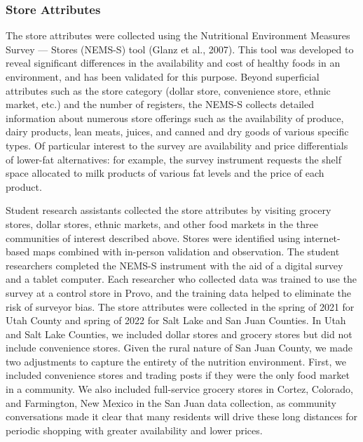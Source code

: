 \documentclass[
  letterpaper,
  number,
  review,
  doubleblind,
  3p]{elsarticle}
\begin{document}
\subsubsection{Store Attributes}\label{store-attributes}

The store attributes were collected using the Nutritional Environment
Measures Survey --- Stores (NEMS-S) tool (Glanz et al., 2007). This tool
was developed to reveal significant differences in the availability and
cost of healthy foods in an environment, and has been validated for this
purpose. Beyond superficial attributes such as the store category
(dollar store, convenience store, ethnic market, etc.) and the number of
registers, the NEMS-S collects detailed information about numerous store
offerings such as the availability of produce, dairy products, lean
meats, juices, and canned and dry goods of various specific types. Of
particular interest to the survey are availability and price
differentials of lower-fat alternatives: for example, the survey
instrument requests the shelf space allocated to milk products of
various fat levels and the price of each product.

Student research assistants collected the store attributes by visiting
grocery stores, dollar stores, ethnic markets, and other food markets in
the three communities of interest described above. Stores were
identified using internet-based maps combined with in-person validation
and observation. The student researchers completed the NEMS-S instrument
with the aid of a digital survey and a tablet computer. Each researcher
who collected data was trained to use the survey at a control store in
Provo, and the training data helped to eliminate the risk of surveyor
bias. The store attributes were collected in the spring of 2021 for Utah
County and spring of 2022 for Salt Lake and San Juan Counties. In Utah
and Salt Lake Counties, we included dollar stores and grocery stores but
did not include convenience stores. Given the rural nature of San Juan
County, we made two adjustments to capture the entirety of the nutrition
environment. First, we included convenience stores and trading posts if
they were the only food market in a community. We also included
full-service grocery stores in Cortez, Colorado, and Farmington, New
Mexico in the San Juan data collection, as community conversations made
it clear that many residents will drive these long distances for
periodic shopping with greater availability and lower prices.
\end{document}
